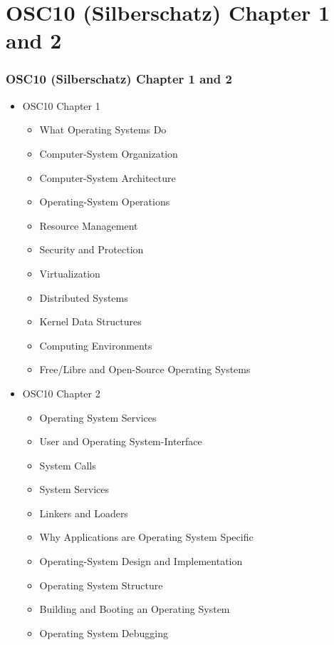 \documentclass[aspectratio=169, xcolor=table, notheorems, hyperref={pdfpagelabels=false}]{beamer}
\begin{document}
\section{OSC10 (Silberschatz) Chapter 1 and 2}
\begin{frame}
\frametitle{OSC10 (Silberschatz) Chapter 1 and 2}
\begin{multicols}{2}
  \begin{itemize}
  \item OSC10 Chapter 1
  \begin{itemize}
  \item What Operating Systems Do
  \item Computer-System Organization
  \item Computer-System Architecture
  \item Operating-System Operations
  \item Resource Management
  \item Security and Protection
  \item Virtualization
  \item Distributed Systems
  \item Kernel Data Structures
  \item Computing Environments
  \item Free/Libre and Open-Source Operating Systems
  \end{itemize}
  \end{itemize}
  \vfill \null
\columnbreak
  \begin{itemize}
  \item OSC10 Chapter 2
  \begin{itemize}
  \item Operating System Services
  \item User and Operating System-Interface
  \item System Calls
  \item System Services
  \item Linkers and Loaders
  \item Why Applications are Operating System Specific
  \item Operating-System Design and Implementation
  \item Operating System Structure
  \item Building and Booting an Operating System
  \item Operating System Debugging
  \end{itemize}
  \end{itemize}
  \vfill \null
\end{multicols}
\end{frame}
\end{document}
